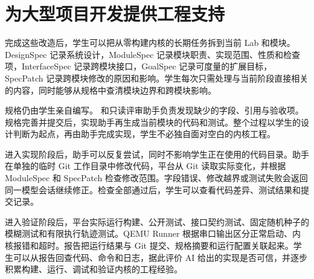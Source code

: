 \section{为大型项目开发提供工程支持}

完成这些改造后，学生可以把从零构建内核的长期任务拆到当前 Lab 和模块。DesignSpec 记录系统设计，ModuleSpec 记录模块职责、实现范围、性质和检查项，InterfaceSpec 记录跨模块接口，GoalSpec 记录可度量的扩展目标，SpecPatch 记录跨模块修改的原因和影响。学生每次只需处理与当前阶段直接相关的内容，同时能够从规格中查清模块边界和跨模块影响。

规格仍由学生亲自编写。 和只读评审助手负责发现缺少的字段、引用与验收项。规格完善并提交后，实现助手再生成当前模块的代码和测试。整个过程以学生的设计判断为起点，再由助手完成实现，学生不必独自面对空白的内核工程。

进入实现阶段后，助手可以反复尝试，同时不影响学生正在使用的代码目录。助手在单独的临时 Git 工作目录中修改代码，平台从 Git 读取实际变化，并根据 ModuleSpec 和 SpecPatch 检查修改范围。字段错误、修改越界或测试失败会返回同一模型会话继续修正。检查全部通过后，学生可以查看代码差异、测试结果和提交记录。

进入验证阶段后，平台实际运行构建、公开测试、接口契约测试、固定随机种子的模糊测试和有限执行轨迹测试。QEMU Runner 根据串口输出区分正常启动、内核报错和超时。报告把运行结果与 Git 提交、规格摘要和运行配置关联起来。学生可以从报告回查代码、命令和日志，据此评价 AI 给出的实现是否可信，并逐步积累构建、运行、调试和验证内核的工程经验。
